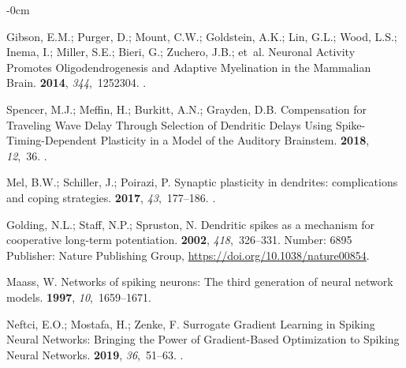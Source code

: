 \documentclass[brainsci, %
               review,submit,pdftex,moreauthors
               ]{Definitions/mdpi}
\begin{document}
\begin{adjustwidth}{-\extralength}{0cm}
\begin{thebibliography}{999}
  Gibson, E.M.; Purger, D.; Mount, C.W.; Goldstein, A.K.; Lin, G.L.; Wood, L.S.;
    Inema, I.; Miller, S.E.; Bieri, G.; Zuchero, J.B.;  et~al.
  \newblock Neuronal {Activity} {Promotes} {Oligodendrogenesis} and {Adaptive}
    {Myelination} in the {Mammalian} {Brain}.
   {\bf 2014}, {\em 344},~1252304.
  .
  
  Spencer, M.J.; Meffin, H.; Burkitt, A.N.; Grayden, D.B.
  \newblock Compensation for {Traveling} {Wave} {Delay} {Through} {Selection} of
    {Dendritic} {Delays} {Using} {Spike}-{Timing}-{Dependent} {Plasticity} in a
    {Model} of the {Auditory} {Brainstem}.
   {\bf 2018}, {\em
    12},~36.
  .
  
  Mel, B.W.; Schiller, J.; Poirazi, P.
  \newblock Synaptic plasticity in dendrites: complications and coping
    strategies.
   {\bf 2017}, {\em 43},~177--186.
  .
  
  Golding, N.L.; Staff, N.P.; Spruston, N.
  \newblock Dendritic spikes as a mechanism for cooperative long-term
    potentiation.
   {\bf 2002}, {\em 418},~326--331.
  \newblock Number: 6895 Publisher: Nature Publishing Group,
    {\url{https://doi.org/10.1038/nature00854}}.
  
  Maass, W.
  \newblock Networks of spiking neurons: {The} third generation of neural network
    models.
   {\bf 1997}, {\em 10},~1659--1671.
  
  Neftci, E.O.; Mostafa, H.; Zenke, F.
  \newblock Surrogate {Gradient} {Learning} in {Spiking} {Neural} {Networks}:
    {Bringing} the {Power} of {Gradient}-{Based} {Optimization} to {Spiking}
    {Neural} {Networks}.
   {\bf 2019}, {\em 36},~51--63.
  .
  

\end{thebibliography}
\end{adjustwidth}
\end{document}
